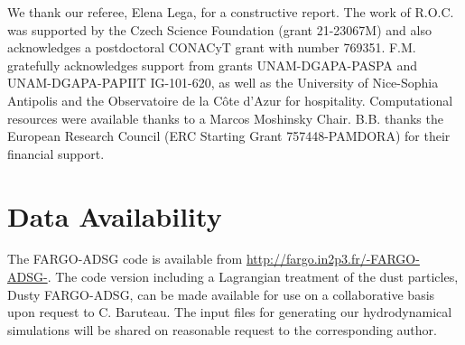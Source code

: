 \documentclass[fleqn,usenatbib]{mnras}
\begin{document}
We thank our referee, Elena Lega, for a constructive report. The work of R.O.C. was supported by the Czech Science Foundation (grant 21-23067M) and also acknowledges a postdoctoral CONACyT grant with number 769351. F.M. gratefully acknowledges support from grants UNAM-DGAPA-PASPA and UNAM-DGAPA-PAPIIT IG-101-620, as well as the University of Nice-Sophia Antipolis and the Observatoire de la C\^ote d'Azur for hospitality. Computational resources were available thanks to a Marcos Moshinsky Chair. B.B. thanks the European Research Council (ERC Starting Grant 757448-PAMDORA) for their financial support.


\section*{Data Availability}

The FARGO-ADSG code is available from \href{http://fargo.in2p3.fr/-FARGO-ADSG-}{http://fargo.in2p3.fr/-FARGO-ADSG-}. The code version including a Lagrangian treatment of the dust particles, Dusty FARGO-ADSG, can be made available for use on a collaborative basis upon request to C. Baruteau. The input files for generating our hydrodynamical simulations will be shared on reasonable request to the corresponding author.












\bsp	%
\label{lastpage}
\end{document}
